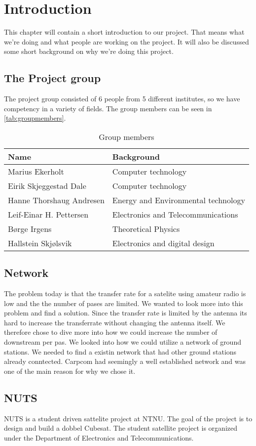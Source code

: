 \chapter{Introduction}
\label{chap:introduction}
This chapter will contain a short introduction to our project. That means what we're doing and what people are working on the project. It will also be discussed some short background on why we're doing this project.
\section{The Project group}
The project group consisted of 6 people from 5 different institutes, so we have competency in a variety of fields. The group members can be seen in \autoref{tab:groupmembers}.

\begin{table}
	\begin{center}
		\begin{tabular}{|l|l|}   
			\hline      
			\bf{Name} & \bf{Background} \\ 
			\hline
			Marius Ekerholt & Computer technology\\     
			\hline
			Eirik Skjeggestad Dale & Computer technology\\     
			\hline
			Hanne Thorshaug Andresen & Energy and Environmental technology\\     
			\hline
			Leif-Einar H. Pettersen & Electronics and Telecommunications\\     
			\hline
			Børge Irgens & Theoretical Physics\\     
			\hline
			Hallstein Skjølsvik & Electronics and digital design\\     
			\hline
		 \end{tabular}
	\end{center}
	\caption{Group members}
	\label{tab:groupmembers}
\end{table}

\section{Network}

The problem today is that the transfer rate for a satelite using amateur radio is low and the the number of pases are limited. We wanted to look more into this problem and find a solution. Since the transfer rate is limited by the antenna its hard to increase the transferrate without changing the antenna itself. We therefore chose to dive more into how we could increase the number of downstream per pas. We looked into how we could utilize a network of ground stations. We needed to find a existin network that had other ground stations already conntected. Carpcom had seemingly a well established network and was one of the main reason for why we chose it.

\section{NUTS}

NUTS is a student driven sattelite project at NTNU. The goal of the project is to design and build a dobbel Cubesat. The student satellite project is organized under the  Department of Electronics and Telecommunications. 